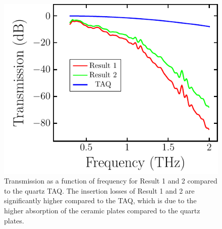 \begin{figure}[ht]
    \centering
    \includegraphics[scale=0.75]{images/results/plots/ceramic/intensity.pdf}
    \caption{Transmission as a function of frequency for Result 1 and 2 compared to the quartz TAQ. The insertion losses of Result 1 and 2 are significantly higher compared to the TAQ, which is due to the higher absorption of the ceramic plates compared to the quartz plates.}
    \label{fig:cl4_intensity}
\end{figure}

